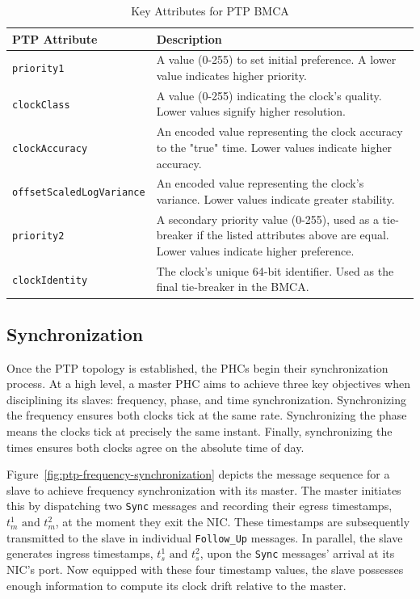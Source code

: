\begin{table}[htbp]
    \centering
    \renewcommand{\arraystretch}{1.2}
    \begin{tabular}{l p{8cm}}
        \toprule
        \textbf{PTP Attribute} & \textbf{Description} \\
        \midrule
        \texttt{priority1} & A value (0-255) to set initial preference. A lower value indicates higher priority. \\
        \texttt{clockClass} & A value (0-255) indicating the clock's quality. Lower values signify higher resolution. \\
        \texttt{clockAccuracy} & An encoded value representing the clock accuracy to the "true" time. Lower values indicate higher accuracy. \\
        \texttt{offsetScaledLogVariance} & An encoded value representing the clock's variance. Lower values indicate greater stability. \\
        \texttt{priority2} & A secondary priority value (0-255), used as a tie-breaker if the listed attributes above are equal. Lower values indicate higher preference. \\
        \texttt{clockIdentity} & The clock's unique 64-bit identifier. Used as the final tie-breaker in the \ac{BMCA}. \\
        \bottomrule
    \end{tabular}
    \caption{Key Attributes for \ac{PTP} \ac{BMCA}}
    \label{tab:bmca-attributes}
\end{table}

\subsection{Synchronization}
\label{subsec:synchronization}
Once the \ac{PTP} topology is established, the \ac{PHC}s begin their synchronization process. At a high level, a master \ac{PHC} aims to achieve three key objectives when disciplining its slaves: frequency, phase, and time synchronization. Synchronizing the frequency ensures both clocks tick at the same rate. Synchronizing the phase means the clocks tick at precisely the same instant. Finally, synchronizing the times ensures both clocks agree on the absolute time of day.

Figure~\ref{fig:ptp-frequency-synchronization} depicts the message sequence for a slave to achieve frequency synchronization with its master. The master initiates this by dispatching two \texttt{Sync} messages and recording their egress timestamps, $t_{m}^{1} \text{ and } t_{m}^{2}$, at the moment they exit the \ac{NIC}. These timestamps are subsequently transmitted to the slave in individual \texttt{Follow\_Up} messages. In parallel, the slave generates ingress timestamps, $t_{s}^{1} \text{ and } t_{s}^{2}$, upon the \texttt{Sync} messages' arrival at its \ac{NIC}'s port. Now equipped with these four timestamp values, the slave possesses enough information to compute its clock drift relative to the master.

